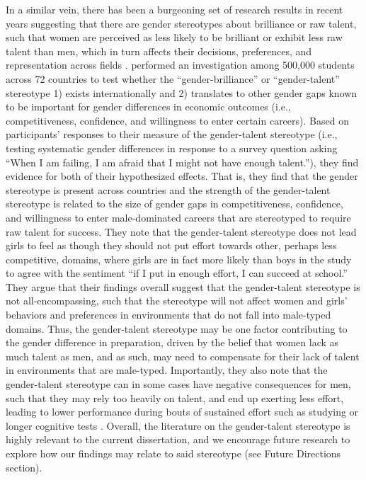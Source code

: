 \documentclass[a4paper, nobind]{templates/ociamthesis}
\begin{document}
In a similar vein, there has been a burgeoning set of research results in recent years suggesting that there are gender stereotypes about brilliance or raw talent, such that women are perceived as less likely to be brilliant or exhibit less raw talent than men, which in turn affects their decisions, preferences, and representation across fields \autocite{Bian2017,Bian2017a,Leslie2015,Meyer2015,Bian2018,Storage2020}. \textcite{Napp2022} performed an investigation among 500,000 students across 72 countries to test whether the ``gender-brilliance'' or ``gender-talent'' stereotype 1) exists internationally and 2) translates to other gender gaps known to be important for gender differences in economic outcomes (i.e., competitiveness, confidence, and willingness to enter certain careers). Based on participants' responses to their measure of the gender-talent stereotype (i.e., testing systematic gender differences in response to a survey question asking ``When I am failing, I am afraid that I might not have enough talent.''), they find evidence for both of their hypothesized effects. That is, they find that the gender stereotype is present across countries and the strength of the gender-talent stereotype is related to the size of gender gaps in competitiveness, confidence, and willingness to enter male-dominated careers that are stereotyped to require raw talent for success. They note that the gender-talent stereotype does not lead girls to feel as though they should not put effort towards other, perhaps less competitive, domains, where girls are in fact more likely than boys in the study to agree with the sentiment ``if I put in enough effort, I can succeed at school.'' They argue that their findings overall suggest that the gender-talent stereotype is not all-encompassing, such that the stereotype will not affect women and girls' behaviors and preferences in environments that do not fall into male-typed domains. Thus, the gender-talent stereotype may be one factor contributing to the gender difference in preparation, driven by the belief that women lack as much talent as men, and as such, may need to compensate for their lack of talent in environments that are male-typed. Importantly, they also note that the gender-talent stereotype can in some cases have negative consequences for men, such that they may rely too heavily on talent, and end up exerting less effort, leading to lower performance during bouts of sustained effort such as studying or longer cognitive tests \autocite{Balart2019}. Overall, the literature on the gender-talent stereotype is highly relevant to the current dissertation, and we encourage future research to explore how our findings may relate to said stereotype (see Future Directions section).
\end{document}
